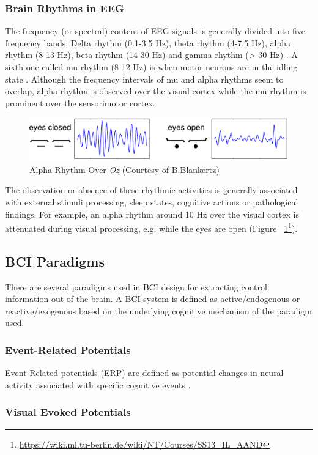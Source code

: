 \documentclass[12pt]{article}
\newcommand\mysubsection[1]{\subsection{#1}}
\newcommand\mysubsubsection[1]{\subsubsection{#1}}
\numberwithin{equation}{section}
\numberwithin{figure}{section}
\numberwithin{table}{section}
\begin{document}
\mysubsubsection{Brain Rhythms in EEG}\label{seq:brain_rhythms}
\par{
    The frequency (or spectral) content of EEG signals is generally divided into five frequency
    bands: Delta rhythm (0.1-3.5 Hz), theta rhythm (4-7.5 Hz), alpha rhythm (8-13 Hz),
    beta rhythm (14-30 Hz) and gamma rhythm (> 30 Hz) \citep{niedermeyer_electroencephalography:_2005}.
    A sixth one called mu rhythm (8-12 Hz) is when motor neurons are in the idling
    state \citep{wang_practical_2010}. Although the frequency intervals of mu and
    alpha rhythms seem to overlap, alpha rhythm is observed over the visual cortex
    while the mu rhythm is prominent over the sensorimotor cortex.
}
    \par{
    \begin{figure}[ht]
        \centering
        \includegraphics[scale=0.8]{images/alpha_eyes}
        \caption[Alpha Rhythm Over Oz]{Alpha Rhythm Over \emph{Oz} (Courtesy of B.Blankertz)}
        \label{fig:eeg_alpha}
    \end{figure}

    The observation or absence of these rhythmic activities is generally associated
    with external stimuli processing, sleep states, cognitive actions or pathological
    findings. For example, an alpha rhythm around 10 Hz over the visual cortex
    is attenuated during visual processing, e.g. while the eyes are open (Figure ~\ref{fig:eeg_alpha}\footnote{\url{https://wiki.ml.tu-berlin.de/wiki/NT/Courses/SS13_IL_AAND}}).
}

\mysubsection{BCI Paradigms}\label{seq:bci_signals}
\par{
    There are several paradigms used in BCI design for extracting control information
    out of the brain. A BCI system is defined as active/endogenous or
    reactive/exogenous based on the underlying cognitive mechanism of the paradigm used.
}
\mysubsubsection{Event-Related Potentials}\label{seq:bci_erp}
\par{
    Event-Related potentials (ERP) are defined as potential changes in
    neural activity associated with specific cognitive events \citep{luck_introduction_2005}.
}
\mysubsubsection{Visual Evoked Potentials}\label{seq:bci_vep}
\par{
}
\end{document}
